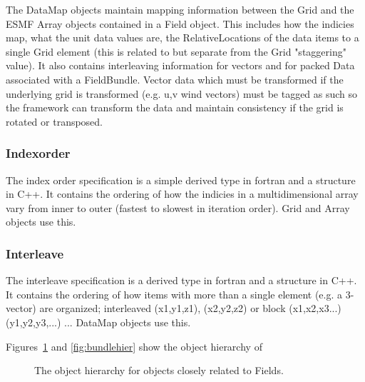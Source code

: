 The DataMap objects maintain mapping information between the
Grid and the ESMF Array objects contained in a Field object.
This includes how the indicies map, what the unit data values are,
the RelativeLocations of the data items to a single Grid element
(this is related to but separate from the Grid "staggering" value).
It also contains interleaving information for vectors and for
packed Data associated with a FieldBundle.
Vector data which must be transformed if the underlying grid
is transformed (e.g. u,v wind vectors) must be tagged as such
so the framework can transform the data and maintain consistency
if the grid is rotated or transposed.

\subsubsection{Indexorder}

The index order specification is 
a simple derived type in fortran and a structure in C++.
It contains the ordering of how the indicies in a multidimensional
array vary from inner to outer (fastest to slowest in iteration
order).  Grid and Array objects use this.

\subsubsection{Interleave}

The interleave specification is a 
derived type in fortran and a structure in C++.
It contains the ordering of how items with more than
a single element (e.g. a 3-vector) are organized; 
interleaved (x1,y1,z1), (x2,y2,z2) or 
block (x1,x2,x3...) (y1,y2,y3,...) ...
DataMap objects use this.


Figures~\ref{fig:fieldhier} and \ref{fig:bundlehier} show the object hierarchy of

\begin{figure}
\caption[Field hierarchy]{The object hierarchy for objects closely related to Fields.}
\label{fig:fieldhier}
\end{figure}



